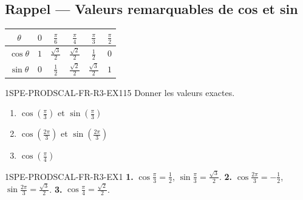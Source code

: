 

\subsection*{Rappel — Valeurs remarquables de cos et sin}

\begin{center}
\begin{tabular}{|c|c|c|c|c|c|}
\hline
$\theta$ & $0$ & $\frac{\pi}{6}$ & $\frac{\pi}{4}$ & $\frac{\pi}{3}$ & $\frac{\pi}{2}$ \\
\hline
$\cos\theta$ & $1$ & $\frac{\sqrt{3}}{2}$ & $\frac{\sqrt{2}}{2}$ & $\frac{1}{2}$ & $0$ \\
\hline
$\sin\theta$ & $0$ & $\frac{1}{2}$ & $\frac{\sqrt{2}}{2}$ & $\frac{\sqrt{3}}{2}$ & $1$ \\
\hline
\end{tabular}
\end{center}

\begin{exercice}{1SPE-PRODSCAL-FR-R3-EX1}{1}{5}
Donner les valeurs exactes.
\begin{enumerate}
  \item $\cos\!\left(\frac{\pi}{3}\right)$ et $\sin\!\left(\frac{\pi}{3}\right)$
  \item $\cos\!\left(\frac{2\pi}{3}\right)$ et $\sin\!\left(\frac{2\pi}{3}\right)$
  \item $\cos\!\left(\frac{\pi}{4}\right)$
\end{enumerate}
\end{exercice}


\begin{corrige}{1SPE-PRODSCAL-FR-R3-EX1}
\textbf{1.} $\cos\frac{\pi}{3} = \frac{1}{2}$, $\sin\frac{\pi}{3} = \frac{\sqrt{3}}{2}$.
\textbf{2.} $\cos\frac{2\pi}{3} = -\frac{1}{2}$, $\sin\frac{2\pi}{3} = \frac{\sqrt{3}}{2}$.
\textbf{3.} $\cos\frac{\pi}{4} = \frac{\sqrt{2}}{2}$.
\end{corrige}

